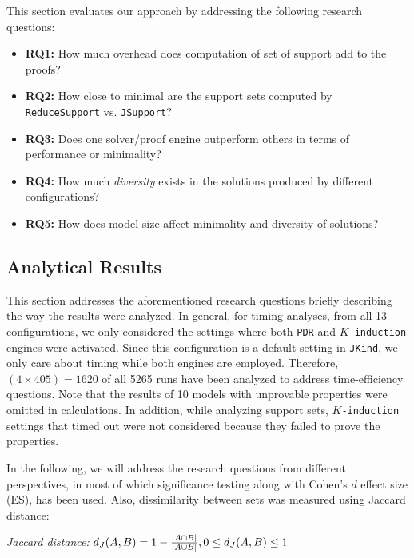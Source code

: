 This section evaluates our approach by addressing the following research questions:

\begin{itemize}
    \item \textbf{RQ1:} How much overhead does computation of set of support add to the proofs?
    \item \textbf{RQ2:} How close to minimal are the support sets computed by \texttt{ReduceSupport} vs. \texttt{JSupport}?
    \item \textbf{RQ3:} Does one solver/proof engine outperform others in terms of performance or minimality?
    \item \textbf{RQ4:} How much {\em diversity} exists in the solutions produced by different configurations?
    \item \textbf{RQ5:} How does model size affect minimality and diversity of solutions?
\end{itemize}

\subsection{Analytical Results}
\label{sec:res}
This section addresses the aforementioned research questions briefly describing the way the results were analyzed. In general, for timing analyses, from all 13 configurations, we only considered the settings where both \texttt{PDR} and \texttt{$K$-induction} engines were activated. Since this configuration is a default setting in \texttt{\texttt{JKind}}, we only care about timing while both engines are employed. Therefore, $(4 \times 405) = 1620$ of all 5265 runs have been analyzed to address time-efficiency questions.
Note that  the results of 10 models with unprovable properties were omitted in calculations. In addition,
 while analyzing support sets, \texttt{$K$-induction} settings that timed out were not considered because they failed to prove the properties.

In the following, we will address the research questions from different perspectives, in most of which significance testing along with Cohen's $d$ effect size (ES), has been used. Also, dissimilarity between sets was measured using Jaccard distance:
\begin{definition}{\emph{Jaccard distance:}}
  \label{def:dj}
  $d_J(\small{A}, \small{B}) = 1 - \frac{|A \cap B|}{|A \cup B|} ,\\ 0 \leq d_J(\small{A}, \small{B}) \leq 1$
\end{definition}

